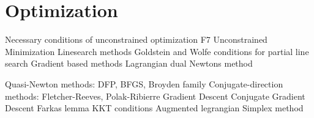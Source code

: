 \part{Optimization}

Necessary conditions of unconstrained optimization F7
Unconstrained Minimization
Linesearch methods
Goldstein and Wolfe conditions for partial line search
Gradient based methods
Lagrangian dual
Newtons method

Quasi-Newton methods: DFP, BFGS, Broyden family
Conjugate-direction methods: Fletcher-Reeves, Polak-Ribierre
Gradient Descent
Conjugate Gradient Descent
Farkas lemma
KKT conditions
Augmented legrangian
Simplex method

